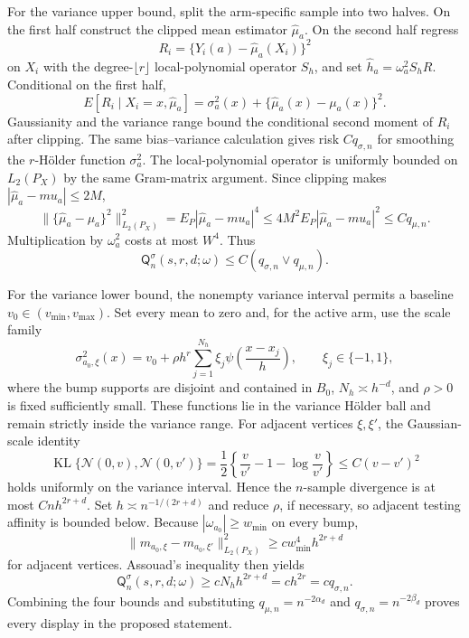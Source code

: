 For the variance upper bound, split the arm-specific sample into two halves.  On the first half construct the clipped mean estimator \(\widehat\mu_a\).  On the second half regress
\[
R_i=\{Y_i(a)-\widehat\mu_a(X_i)\}^2
\]
on \(X_i\) with the degree-\(\lfloor r\rfloor\) local-polynomial operator \(S_h\), and set \(\widehat h_a=\omega_a^2S_hR\).  Conditional on the first half,
\[
E[R_i\mid X_i=x,\widehat\mu_a]
=\sigma_a^2(x)+\{\widehat\mu_a(x)-\mu_a(x)\}^2.
\]
Gaussianity and the variance range bound the conditional second moment of \(R_i\) after clipping.  The same bias--variance calculation gives risk \(Cq_{\sigma,n}\) for smoothing the \(r\)-Hölder function \(\sigma_a^2\).  The local-polynomial operator is uniformly bounded on \(L_2(P_X)\) by the same Gram-matrix argument.  Since clipping makes \(|\widehat\mu_a-mu_a|\leq2M\),
\[
\|\{\widehat\mu_a-\mu_a\}^2\|_{L_2(P_X)}^2
=E_P|\widehat\mu_a-mu_a|^4
\leq4M^2E_P|\widehat\mu_a-mu_a|^2
\leq Cq_{\mu,n}.
\]
Multiplication by \(\omega_a^2\) costs at most \(W^4\).  Thus
\[
\mathsf Q_n^{\sigma}(s,r,d;\omega)
\leq C(q_{\sigma,n}\vee q_{\mu,n}).
\]

For the variance lower bound, the nonempty variance interval permits a baseline \(v_0\in(v_{\min},v_{\max})\).  Set every mean to zero and, for the active arm, use the scale family
\[
\sigma_{a_0,\xi}^2(x)=v_0+\rho h^r\sum_{j=1}^{N_h}\xi_j
\psi\!\left(\frac{x-x_j}{h}\right),\qquad \xi_j\in\{-1,1\},
\]
where the bump supports are disjoint and contained in \(B_0\), \(N_h\asymp h^{-d}\), and \(\rho>0\) is fixed sufficiently small.  These functions lie in the variance Hölder ball and remain strictly inside the variance range.  For adjacent vertices \(\xi,\xi'\), the Gaussian-scale identity
\[
\operatorname{KL}\{\mathcal N(0,v),\mathcal N(0,v')\}
=\frac12\left\{\frac{v}{v'}-1-\log\frac{v}{v'}\right\}
\leq C(v-v')^2
\]
holds uniformly on the variance interval.  Hence the \(n\)-sample divergence is at most \(Cn h^{2r+d}\).  Set \(h\asymp n^{-1/(2r+d)}\) and reduce \(\rho\), if necessary, so adjacent testing affinity is bounded below.  Because \(|\omega_{a_0}|\geq w_{\min}\) on every bump,
\[
\|m_{a_0,\xi}-m_{a_0,\xi'}\|_{L_2(P_X)}^2
\geq c w_{\min}^4 h^{2r+d}
\]
for adjacent vertices.  Assouad's inequality then yields
\[
\mathsf Q_n^{\sigma}(s,r,d;\omega)
\geq cN_hh^{2r+d}=c h^{2r}=c q_{\sigma,n}.
\]
Combining the four bounds and substituting \(q_{\mu,n}=n^{-2\alpha_d}\) and \(q_{\sigma,n}=n^{-2\beta_d}\) proves every display in the proposed statement.